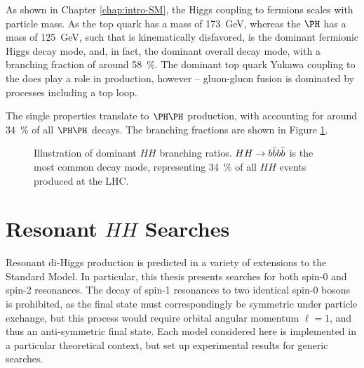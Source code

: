 As shown in Chapter \ref{chap:intro-SM}, the Higgs coupling to fermions scales with particle mass. 
As the top quark has a mass of \SI{173}{\GeV}, whereas the $\higgs$ has a mass of \SI{125}{\GeV}, such that 
\HepProcess{\higgs \to \Pqt\Paqt} is kinematically disfavored, \HepProcess{\higgs \to \Pqb\Paqb} is the dominant 
fermionic Higgs decay mode, and, in fact, 
the dominant overall decay mode, with a branching fraction of around 58~\%. The dominant top quark Yukawa coupling to 
the \higgs does play a role in \higgs production, however -- gluon-gluon fusion is dominated by processes including 
a top loop.

The single \higgs properties translate to $\higgs\higgs$ production, with \HepProcess{\higgs\higgs \to \bbbb} accounting
for around 34~\% of all $\higgs\higgs$ decays. The \higgs\higgs branching fractions are shown in Figure \ref{fig:hh-br}.
\begin{figure}[ht]
\centering
{}
\caption{\label{fig:hh-br} Illustration of dominant $HH$ branching ratios. $HH\rightarrow b\bar{b}b\bar{b}$ is the most common 
decay mode, representing 34~\% of all $HH$ events produced at the LHC.}
\end{figure}

\section{Resonant $HH$ Searches}
Resonant di-Higgs production is predicted in a variety of extensions to the
Standard Model. In particular, this thesis presents searches for both spin-0 and spin-2 resonances. 
The decay of spin-1 resonances to two identical spin-0 bosons is prohibited, as the final state 
must correspondingly be symmetric under particle exchange, but this process would require 
orbital angular momentum $\ell = 1$, and thus an anti-symmetric final state.
Each model considered here is implemented in a particular theoretical context, but set up experimental results 
for generic searches.

